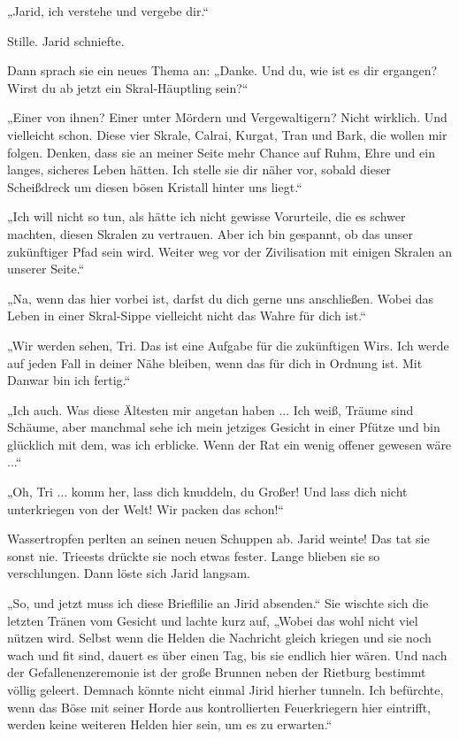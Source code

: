 „Jarid, ich verstehe und vergebe dir.“

Stille. Jarid schniefte.

Dann sprach sie ein neues Thema an: „Danke. Und du, wie ist es dir ergangen? Wirst du ab jetzt ein Skral-Häuptling sein?“

„Einer von ihnen? Einer unter Mördern und Vergewaltigern? Nicht wirklich. Und vielleicht schon. Diese vier Skrale, Calrai, Kurgat, Tran und Bark, die wollen mir folgen. Denken, dass sie an meiner Seite mehr Chance auf Ruhm, Ehre und ein langes, sicheres Leben hätten. Ich stelle sie dir näher vor, sobald dieser Scheißdreck um diesen bösen Kristall hinter uns liegt.“

„Ich will nicht so tun, als hätte ich nicht gewisse Vorurteile, die es schwer machten, diesen Skralen zu vertrauen. Aber ich bin gespannt, ob das unser zukünftiger Pfad sein wird. Weiter weg vor der Zivilisation mit einigen Skralen an unserer Seite.“

„Na, wenn das hier vorbei ist, darfst du dich gerne uns anschließen. Wobei das Leben in einer Skral-Sippe vielleicht nicht das Wahre für dich ist.“

„Wir werden sehen, Tri. Das ist eine Aufgabe für die zukünftigen Wirs. Ich werde auf jeden Fall in deiner Nähe bleiben, wenn das für dich in Ordnung ist. Mit Danwar bin ich fertig.“

„Ich auch. Was diese Ältesten mir angetan haben ... Ich weiß, Träume sind Schäume, aber manchmal sehe ich mein jetziges Gesicht in einer Pfütze und bin glücklich mit dem, was ich erblicke. Wenn der Rat ein wenig offener gewesen wäre ...“

„Oh, Tri ... komm her, lass dich knuddeln, du Großer! Und lass dich nicht unterkriegen von der Welt! Wir packen das schon!“

Wassertropfen perlten an seinen neuen Schuppen ab. Jarid weinte! Das tat sie sonst nie. Trieests drückte sie noch etwas fester. Lange blieben sie so verschlungen. Dann löste sich Jarid langsam.

„So, und jetzt muss ich diese Brieflilie an Jirid absenden.“ Sie wischte sich die letzten Tränen vom Gesicht und lachte kurz auf, „Wobei das wohl nicht viel nützen wird. Selbst wenn die Helden die Nachricht gleich kriegen und sie noch wach und fit sind, dauert es über einen Tag, bis sie endlich hier wären. Und nach der Gefallenenzeremonie ist der große Brunnen neben der Rietburg bestimmt völlig geleert. Demnach könnte nicht einmal Jirid hierher tunneln. Ich befürchte, wenn das Böse mit seiner Horde aus kontrollierten Feuerkriegern hier eintrifft, werden keine weiteren Helden hier sein, um es zu erwarten.“

